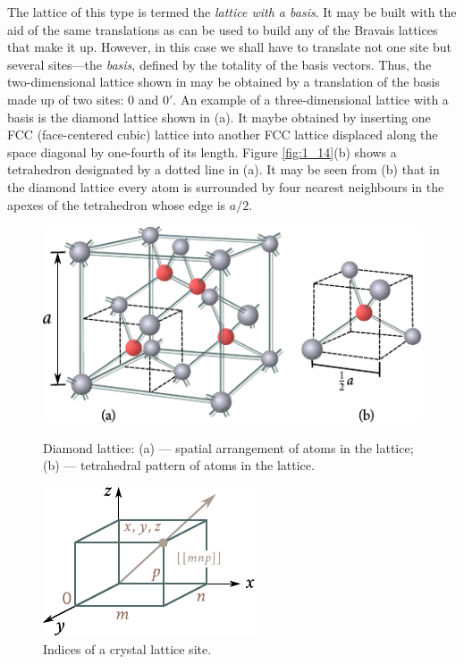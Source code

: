 The lattice of this type is termed the \textit{lattice with a basis}. It may be built with the aid of the same translations as can be used to build any of the Bravais lattices that make it up. However, in this case
we shall have to translate not one site but several sites---the \textit{basis}, defined by the totality of the basis vectors. Thus, the two-dimensional lattice shown in  may be obtained by a translation of the basis made up of two sites: $0$ and $0'$. An example of a three-dimensional lattice with a basis is the diamond lattice shown in (a). It maybe obtained by inserting one FCC (face-centered
cubic) lattice into another FCC lattice displaced along the space diagonal by one-fourth of its length. Figure \ref{fig:1_14}(b) shows a tetrahedron designated by a dotted line in (a). It may be seen from (b) that in the diamond lattice every atom is surrounded by four nearest neighbours in the apexes of the tetrahedron whose edge is $a/2$.

\begin{figure}[t]
	\begin{minipage}[t]{0.6\linewidth}
		\begin{center}
			\includegraphics[scale=0.9]{figures/ch_01/fig_1_14.pdf}
			\caption[]{Diamond lattice: (a) --- spatial arrangement of atoms in the lattice; (b) --- tetrahedral pattern of atoms in the lattice.}
			\label{fig:1_14}
		\end{center}
	\end{minipage}
	\hfill{ }%
	\begin{minipage}[t]{0.33\linewidth}
		\begin{center}
			\includegraphics[scale=0.92]{figures/ch_01/fig_1_15.pdf}
			\caption[]{Indices of a crystal lattice site.}
			\label{fig:1_15}
		\end{center}
	\end{minipage}
\vspace{-0.3cm}
\end{figure}


